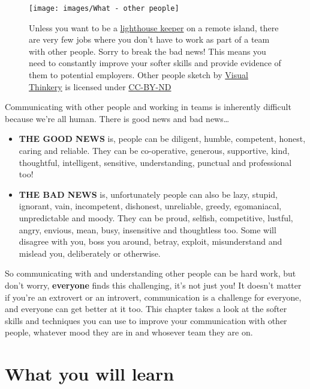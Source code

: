 \documentclass[
]{book}
\providecommand{\tightlist}{%
  \setlength{\itemsep}{0pt}\setlength{\parskip}{0pt}}
\begin{document}
\begin{figure}

{\centering \texttt{[image: images/What - other people]} 

}

\caption{Unless you want to be a \href{https://en.wikipedia.org/wiki/Lighthouse_keeper}{lighthouse keeper} on a remote island, there are very few jobs where you don't have to work as part of a team with other people. Sorry to break the bad news! This means you need to constantly improve your softer skills and provide evidence of them to potential employers. Other people sketch by \href{https://visualthinkery.com}{Visual Thinkery} is licensed under \href{https://creativecommons.org/licenses/by-nd/4.0/}{CC-BY-ND}}\label{fig:otherpeople-fig}
\end{figure}



Communicating with other people and working in teams is inherently difficult because we're all human. There is good news and bad news\ldots{}

\begin{itemize}
\tightlist
\item
  \textbf{THE GOOD NEWS} is, people can be diligent, humble, competent, honest, caring and reliable. They can be co-operative, generous, supportive, kind, thoughtful, intelligent, sensitive, understanding, punctual and professional too!
\item
  \textbf{THE BAD NEWS} is, unfortunately people can also be lazy, stupid, ignorant, vain, incompetent, dishonest, unreliable, greedy, egomaniacal, unpredictable and moody. They can be proud, selfish, competitive, lustful, angry, envious, mean, busy, insensitive and thoughtless too. Some will disagree with you, boss you around, betray, exploit, misunderstand and mislead you, deliberately or otherwise. \citep{sevendeadly}
\end{itemize}

So communicating with and understanding other people can be hard work, but don't worry, \textbf{everyone} finds this challenging, it's not just you! It doesn't matter if you're an extrovert or an introvert, communication is a challenge for everyone, and everyone can get better at it too. This chapter takes a look at the softer skills and techniques you can use to improve your communication with other people, whatever mood they are in and whosever team they are on.

\hypertarget{what-you-will-learn}{%
\section{What you will learn}\label{what-you-will-learn}}
\end{document}
